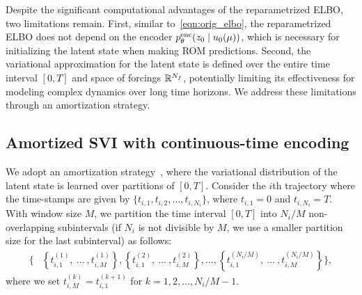 \documentclass{article}
\begin{document}
	
	Despite the significant computational advantages of the reparametrized ELBO, two limitations remain. 
	First, similar to~\eqref{eqn:orig_elbo}, the reparametrized ELBO does not depend on the encoder $p_\theta^{\rm enc} (z_0 \;|\;u_0(\mu))$, which is necessary for initializing the latent state when making ROM predictions. Second, the variational approximation for the latent state is defined over the entire time interval $[0,T]$ and space of forcings $\mathbb{R}^{N_f}$, potentially limiting its effectiveness for modeling complex dynamics over long time horizons. We address these limitations through an amortization strategy. 
	
	
	\subsection{Amortized SVI with continuous-time encoding} \label{sec:amortized}
	
	We adopt an amortization strategy~\cite{Course_2023_Amortized_Reparameterization}, where the variational distribution of the latent state is learned over partitions of $[0,T]$. Consider the $i$th trajectory where the time-stamps are given by $\{ t_{i,1}, t_{i,2}, \ldots, t_{i,N_i} \}$, where $t_{i,1} = 0$ and $t_{i,N_i} = T$. With window size $M$, we partition the time interval $[0,T]$ into $N_i/M$ non-overlapping subintervals (if $N_i$ is not divisible by $M$, we use a smaller partition size for the last subinterval) as follows:
	\begin{equation} \label{eqn:time_partition}
		\begin{aligned}
			\Big\{ & \left \{
			t_{i,1}^{(1)}, ~ \ldots ~, t_{i,M}^{(1)}\right \}, \left \{ t_{i,1}^{(2)}, ~ \ldots ~, t_{i,M}^{(2)} \right \}, 
			\ldots, \left \{
			t_{i,1}^{(N_i/M)}, ~\ldots~, t_{i,M}^{(N_i/M)} \right \} \Big\},
		\end{aligned}
	\end{equation}
	where we set $t_{i,M}^{(k)} = t_{i,1}^{(k+1)}$ for $k=1,2,\ldots,N_i/M-1$.
	
\end{document}
